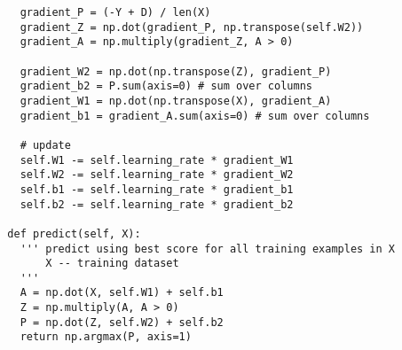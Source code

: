 \begin{verbatim}
    gradient_P = (-Y + D) / len(X)
    gradient_Z = np.dot(gradient_P, np.transpose(self.W2))
    gradient_A = np.multiply(gradient_Z, A > 0)

    gradient_W2 = np.dot(np.transpose(Z), gradient_P)
    gradient_b2 = P.sum(axis=0) # sum over columns
    gradient_W1 = np.dot(np.transpose(X), gradient_A)
    gradient_b1 = gradient_A.sum(axis=0) # sum over columns

    # update
    self.W1 -= self.learning_rate * gradient_W1
    self.W2 -= self.learning_rate * gradient_W2
    self.b1 -= self.learning_rate * gradient_b1
    self.b2 -= self.learning_rate * gradient_b2
  
  def predict(self, X):
    ''' predict using best score for all training examples in X
        X -- training dataset
    '''
    A = np.dot(X, self.W1) + self.b1
    Z = np.multiply(A, A > 0)
    P = np.dot(Z, self.W2) + self.b2
    return np.argmax(P, axis=1)
\end{verbatim}
